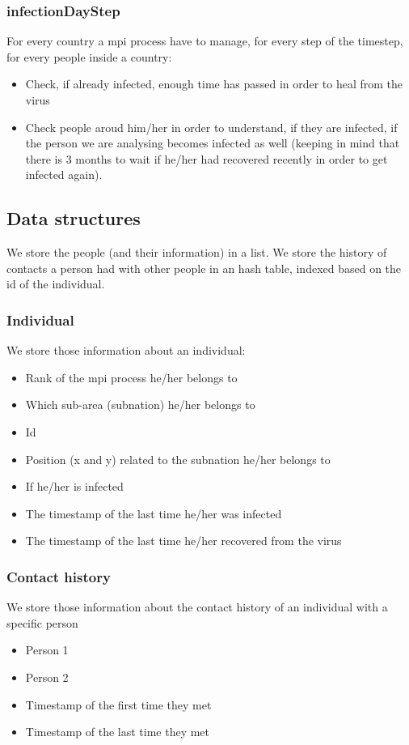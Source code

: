 \documentclass[table, 12pt]{article}
\begin{document}
\subsubsection{infectionDayStep}

For every country a mpi process have to manage, for every step of the timestep, for every people inside a country:

\begin{itemize}
\setlength\itemsep{-0.5em}
\item Check, if already infected, enough time has passed in order to heal from the virus
\item Check people aroud him/her in order to understand, if they are infected, if the person we are analysing becomes infected as well (keeping in mind that there is 3 months to wait if he/her had recovered recently in order to get infected again).
\end{itemize}

\subsection{Data structures}
We store the people (and their information) in a list.
We store the history of contacts a person had with other people in an hash table, indexed based on the id of the individual.

\subsubsection{Individual}
We store those information about an individual: 
\begin{itemize}
\setlength\itemsep{-0.5em}
\item Rank of the mpi process he/her belongs to
\item Which sub-area (subnation) he/her belongs to
\item Id
\item Position (x and y) related to the subnation he/her belongs to 
\item If he/her is infected
\item The timestamp of the last time he/her was infected
\item The timestamp of the last time he/her recovered from the virus
\end{itemize}

\subsubsection{Contact history}
We store those information about the contact history of an individual with a specific person
\begin{itemize}
\setlength\itemsep{-0.5em}
\item Person 1
\item Person 2
\item Timestamp of the first time they met
\item Timestamp of the last time they met
\end{itemize}
\end{document}

